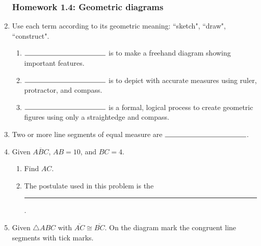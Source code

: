 \documentclass[12pt, oneside]{article}
\begin{document}
\begin{enumerate}
\newpage
\subsubsection*{Homework 1.4: Geometric diagrams}
  \item Use each term according to its geometric meaning: ``sketch", ``draw", ``construct".
  \begin{enumerate}
    \item $\rule{4cm}{0.15mm}$ is to make a freehand diagram showing important features.
    \item $\rule{4cm}{0.15mm}$ is to depict with accurate measures using ruler, protractor, and compass.
    \item $\rule{4cm}{0.15mm}$ is a formal, logical process to create geometric figures using only a straightedge and compass.
  \end{enumerate}

  \item Two or more line segments of equal measure are $\rule{4cm}{0.15mm}$.

  \item Given $\overline{ABC}$, $AB=10$, and $BC=4$.
  \begin{enumerate}
    \item Find ${AC}$.\\[0.75cm]
    \item The postulate used in this problem is the \rule{6cm}{0.15mm}.
  \end{enumerate}
  \smallskip

  \item Given $\triangle ABC$ with $\overline{AC} \cong \overline{BC}$. On the diagram mark the congruent line segments with tick marks.
  \begin{center}
  \end{center}


\end{enumerate}
\end{document}

